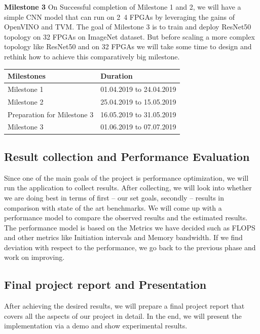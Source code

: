 \documentclass[titlepage]{report}
\begin{document}
\textbf{Milestone 3} On Successful completion of Milestone 1 and 2, we will have a simple CNN model that can run on 2~4 FPGAs by leveraging the gains of OpenVINO and TVM. The goal of Milestone 3 is to train and deploy ResNet50 topology on 32 FPGAs on ImageNet dataset. But before scaling a more complex topology like ResNet50 and on 32 FPGAs we will take some time to design and rethink how to achieve this comparatively big milestone.

\begin{table}[]
\begin{tabular}{|l|l|}
\hline
Milestones                  & Duration                 \\ \hline
Milestone 1                 & 01.04.2019 to 24.04.2019 \\ \hline
Milestone 2                 & 25.04.2019 to 15.05.2019 \\ \hline
Preparation for Milestone 3 & 16.05.2019 to 31.05.2019 \\ \hline
Milestone 3                 & 01.06.2019 to 07.07.2019 \\ \hline
\end{tabular}
\end{table}

\subsection{Result collection and Performance Evaluation}
Since one of the main goals of the project is performance optimization, we will run the application to collect results. After collecting, we will look into whether we are doing best in terms of first – our set goals, secondly – results in comparison with state of the art benchmarks. We will come up with a performance model to compare the observed results and the estimated results. The performance model is based on the Metrics we have decided such as FLOPS and other metrics like Initiation intervals and Memory bandwidth. If we find deviation with respect to the performance, we go back to the previous phase and work on improving.

\subsection{Final project report and Presentation}
After achieving the desired results, we will prepare a final project report that covers all the aspects of our project in detail. In the end, we will present the implementation via a demo and show experimental results. 
\end{document}
